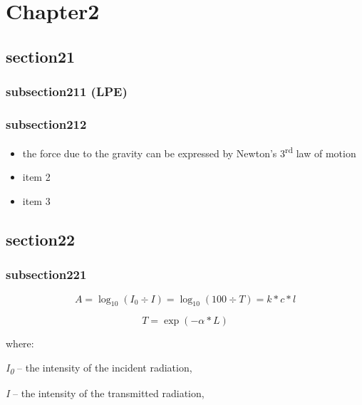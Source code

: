 \chapter{Chapter2}\label{Chapter2}
\section{section21}\label{section21}
\subsection{subsection211 (\acs{LPE})}\label{subsection211}
\lipsum[1]

\subsection{subsection212}\label{subsection212}
\lipsum[1-2]


\begin{itemize}
\item
  the force due to the gravity can be expressed by Newton's
  3\textsuperscript{rd} law of motion
\item
  item 2
\item
  item 3
\end{itemize}

\lipsum[1-3]



\section{section22}\label{section22}
\subsection{subsection221}\label{subsection221}
\lipsum[1]


\begin{equation} 
A = \log_{10} (I_{0} \div I) = \log_{10} (100 \div T) = k \ast c \ast l
\label{eq:ch02eq1}
\end{equation}

\begin{equation} 
T = \exp (- \alpha \ast L)
\label{eq:ch02eq2}
\end{equation}

where:

\emph{I\textsubscript{0}} -- the intensity of the incident radiation,

\emph{I} -- the intensity of the transmitted radiation,

